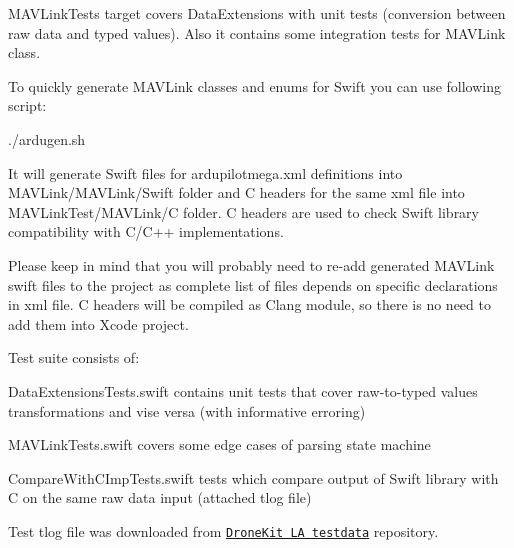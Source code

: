 {\ttfamily M\+A\+V\+Link\+Tests} target covers {\ttfamily Data\+Extensions} with unit tests (conversion between raw data and typed values). Also it contains some integration tests for {\ttfamily M\+A\+V\+Link} class.

To quickly generate M\+A\+V\+Link classes and enums for Swift you can use following script\+:


\begin{DoxyCode}
./ardugen.sh
\end{DoxyCode}
 It will generate Swift files for {\ttfamily ardupilotmega.\+xml} definitions into {\ttfamily M\+A\+V\+Link/\+M\+A\+V\+Link/\+Swift} folder and C headers for the same xml file into {\ttfamily M\+A\+V\+Link\+Test/\+M\+A\+V\+Link/C} folder. C headers are used to check Swift library compatibility with C/\+C++ implementations.

Please keep in mind that you will probably need to re-\/add generated M\+A\+V\+Link swift files to the project as complete list of files depends on specific declarations in xml file. C headers will be compiled as Clang module, so there is no need to add them into Xcode project.

Test suite consists of\+:
\begin{DoxyItemize}
\item {\ttfamily Data\+Extensions\+Tests.\+swift} contains unit tests that cover raw-\/to-\/typed values transformations and vise versa (with informative erroring)
\item {\ttfamily M\+A\+V\+Link\+Tests.\+swift} covers some edge cases of parsing state machine
\item {\ttfamily Compare\+With\+C\+Imp\+Tests.\+swift} tests which compare output of Swift library with C on the same raw data input (attached tlog file)
\end{DoxyItemize}

Test tlog file was downloaded from \href{https://github.com/dronekit/dronekit-la-testdata}{\tt Drone\+Kit LA testdata} repository. 